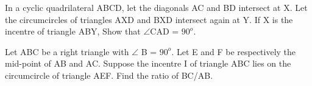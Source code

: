 \item In a cyclic quadrilateral ABCD, let the diagonals AC and BD intersect at X. Let the circumcircles of triangles AXD and BXD intersect again at Y. If X is the incentre of triangle ABY, Show that $\angle$CAD = $90^{o}$.

\item Let ABC be a right triangle with $\angle$ B = $90^{o}$. Let E and F be respectively the mid-point of AB and AC. Suppose the incentre I of triangle ABC lies on the circumcircle of triangle AEF. Find the ratio of BC/AB.
